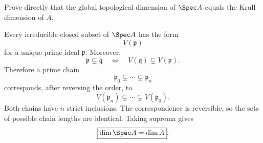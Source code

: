 \begin{problem}\label{prob:vi30-03}
Prove directly that the global topological dimension of \(\Spec A\) equals the Krull dimension of \(A\).

\end{problem}

\ifdefined\FullProblemDossiers
\begin{solution}
Every irreducible closed subset of \(\Spec A\) has the form
\[
V(\mathfrak p)
\]
for a unique prime ideal \(\mathfrak p\). Moreover,
\[
\mathfrak p\subsetneq\mathfrak q
\quad\Longleftrightarrow\quad
V(\mathfrak q)\subsetneq V(\mathfrak p).
\]
Therefore a prime chain
\[
\mathfrak p_0\subsetneq\cdots\subsetneq\mathfrak p_n
\]
corresponds, after reversing the order, to
\[
V(\mathfrak p_n)\subsetneq\cdots\subsetneq V(\mathfrak p_0).
\]
Both chains have \(n\) strict inclusions. The correspondence is reversible, so the sets of possible chain lengths
are identical. Taking suprema gives
\[
\boxed{\dim\Spec A=\dim A}.
\]
\end{solution}
\fi
